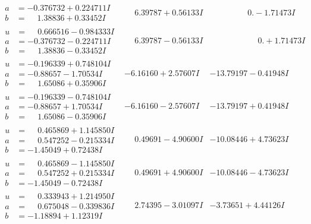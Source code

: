 \documentclass[1p]{elsarticle_modified}
\theoremstyle{definition}
\begin{document}
$$\begin{array}{c|c|c}
\begin{aligned}
a &= -0.376732 + 0.224711 I \\
b &= \phantom{-}1.38836 + 0.33452 I\end{aligned}
 & \phantom{-}6.39787 + 0.56133 I & \phantom{-0.000000 } 0. - 1.71473 I \\ \hline\begin{aligned}
u &= \phantom{-}0.666516 - 0.984333 I \\
a &= -0.376732 - 0.224711 I \\
b &= \phantom{-}1.38836 - 0.33452 I\end{aligned}
 & \phantom{-}6.39787 - 0.56133 I & \phantom{-0.000000 -}0. + 1.71473 I \\ \hline\begin{aligned}
u &= -0.196339 + 0.748104 I \\
a &= -0.88657 - 1.70534 I \\
b &= \phantom{-}1.65086 + 0.35906 I\end{aligned}
 & -6.16160 + 2.57607 I & -13.79197 - 0.41948 I \\ \hline\begin{aligned}
u &= -0.196339 - 0.748104 I \\
a &= -0.88657 + 1.70534 I \\
b &= \phantom{-}1.65086 - 0.35906 I\end{aligned}
 & -6.16160 - 2.57607 I & -13.79197 + 0.41948 I \\ \hline\begin{aligned}
u &= \phantom{-}0.465869 + 1.145850 I \\
a &= \phantom{-}0.547252 - 0.215334 I \\
b &= -1.45049 + 0.72438 I\end{aligned}
 & \phantom{-}0.49691 - 4.90600 I & -10.08446 + 4.73623 I \\ \hline\begin{aligned}
u &= \phantom{-}0.465869 - 1.145850 I \\
a &= \phantom{-}0.547252 + 0.215334 I \\
b &= -1.45049 - 0.72438 I\end{aligned}
 & \phantom{-}0.49691 + 4.90600 I & -10.08446 - 4.73623 I \\ \hline\begin{aligned}
u &= \phantom{-}0.333943 + 1.214950 I \\
a &= \phantom{-}0.675048 - 0.339836 I \\
b &= -1.18894 + 1.12319 I\end{aligned}
 & \phantom{-}2.74395 - 3.01097 I & -3.73651 + 4.44126 I \\ \hline\begin{aligned}

\end{aligned}
\end{array}$$
\end{document}
